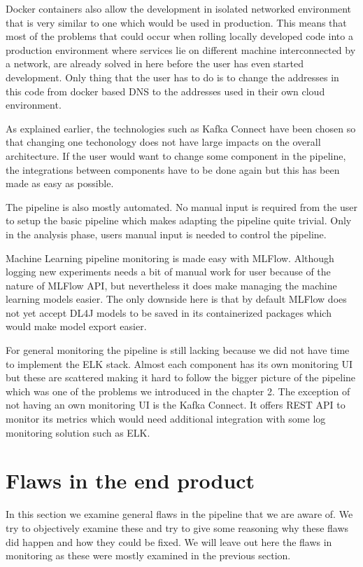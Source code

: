 Docker containers also allow the development in isolated networked environment that is very similar to one which would be used in production.
This means that most of the problems that could occur when rolling locally developed code into a production environment where services lie on different machine interconnected by a network, are already solved in here before the user has even started development.
Only thing that the user has to do is to change the addresses in this code from docker based DNS to the addresses used in their own cloud environment.

As explained earlier, the technologies such as Kafka Connect have been chosen so that changing one techonology does not have large impacts on the overall architecture.
If the user would want to change some component in the pipeline, the integrations between components have to be done again but this has been made as easy as possible.

The pipeline is also mostly automated.
No manual input is required from the user to setup the basic pipeline which makes adapting the pipeline quite trivial.
Only in the analysis phase, users manual input is needed to control the pipeline.

Machine Learning pipeline monitoring is made easy with MLFlow.
Although logging new experiments needs a bit of manual work for user because of the nature of MLFlow API, but nevertheless it does make managing the machine learning models easier.
The only downside here is that by default MLFlow does not yet accept DL4J models to be saved in its containerized packages which would make model export easier.

For general monitoring the pipeline is still lacking because we did not have time to implement the ELK stack.
Almost each component has its own monitoring UI but these are scattered making it hard to follow the bigger picture of the pipeline which was one of the problems we introduced in the chapter 2.
The exception of not having an own monitoring UI is the Kafka Connect.
It offers REST API to monitor its metrics which would need additional integration with some log monitoring solution such as ELK.

\section{Flaws in the end product}

In this section we examine general flaws in the pipeline that we are aware of.
We try to objectively examine these and try to give some reasoning why these flaws did happen and how they could be fixed.
We will leave out here the flaws in monitoring as these were mostly examined in the previous section.

